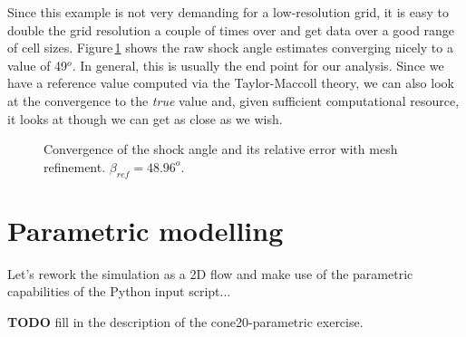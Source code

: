 \medskip
Since this example is not very demanding for a low-resolution grid, 
it is easy to double the grid resolution a couple of times over and get
data over a good range of cell sizes.
Figure\,\ref{cone20-grid-convergence-fig} shows the raw shock angle estimates
converging nicely to a value of 49$^o$.
In general, this is usually the end point for our analysis.
Since we have a reference value computed via the Taylor-Maccoll theory,
we can also look at the convergence to the \textit{true} value and,
given sufficient computational resource, 
it looks at though we can get as close as we wish.

\begin{figure}
 \centering
 \parbox{0.45\textwidth}{
 }
 \parbox{0.45\textwidth}{
 }
 \caption{Convergence of the shock angle and its relative error with mesh refinement.
          $\beta_{ref} = 48.96^o$.}
 \label{cone20-grid-convergence-fig}
\end{figure}

\section{Parametric modelling}
%
Let's rework the simulation as a 2D flow and make use of the parametric capabilities of the 
Python input script...

\textbf{TODO} fill in the description of the cone20-parametric exercise.


